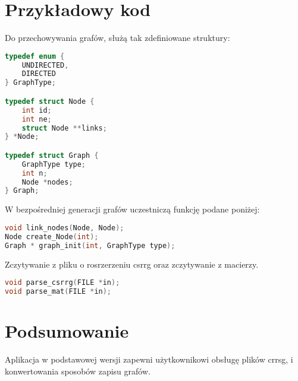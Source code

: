 \documentclass[a4paper,12pt]{article}
\begin{document}
\section{Przykładowy kod}
Do przechowywania grafów, służą tak zdefiniowane struktury:
\begin{lstlisting}[language=C, caption=struktura grafu]
typedef enum {
    UNDIRECTED,
    DIRECTED
} GraphType;

typedef struct Node {
    int id;
    int ne;
    struct Node **links;
} *Node;

typedef struct Graph {
    GraphType type;
    int n;  
    Node *nodes;
} Graph;
\end{lstlisting}
W bezpośredniej generacji grafów uczestniczą funkcję podane poniżej:
\begin{lstlisting}[language=C, caption=generacja]
void link_nodes(Node, Node);
Node create_Node(int);
Graph * graph_init(int, GraphType type);
\end{lstlisting}
Zczytywanie z pliku o rosrzerzeniu csrrg oraz zczytywanie z macierzy.
\begin{lstlisting}[language=C, caption=parsowanie i konwertowanie]
void parse_csrrg(FILE *in);
void parse_mat(FILE *in);
\end{lstlisting}

\section{Podsumowanie}
Aplikacja w podstawowej wersji zapewni użytkownikowi obsługę plików crrsg, i konwertowania sposobów zapisu grafów.
\end{document}
